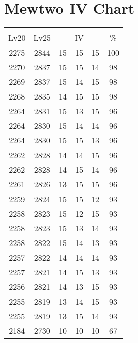 \documentclass{article}%
\begin{document}
%
\normalsize%
\section{Mewtwo IV Chart}%
\label{sec:Mewtwo IV Chart}%
\renewcommand{\arraystretch}{1.5}%
\begin{tabular}{|c|c|c|c|c|c|}%
\hline%
\multicolumn{6}{|c|}{\textcolor{white}{ 
\linebreak{Mewtwo}
}%
\cellcolor{black}}\\%
\multicolumn{1}{|c}{Lv20}&\multicolumn{1}{c|}{Lv25}&\multicolumn{3}{c|}{IV}&\multicolumn{1}{|c|}{\%}\\%
\hline%
\rowcolor{color100}%
2275&2844&15&15&15&100\\%
\hline%
\rowcolor{color98}%
2270&2837&15&15&14&98\\%
\hline%
\rowcolor{color98}%
2269&2837&15&14&15&98\\%
\hline%
\rowcolor{color98}%
2268&2835&14&15&15&98\\%
\hline%
\rowcolor{color96}%
2264&2831&15&13&15&96\\%
\hline%
\rowcolor{color96}%
2264&2830&15&14&14&96\\%
\hline%
\rowcolor{color96}%
2264&2830&15&15&13&96\\%
\hline%
\rowcolor{color96}%
2262&2828&14&14&15&96\\%
\hline%
\rowcolor{color96}%
2262&2828&14&15&14&96\\%
\hline%
\rowcolor{color96}%
2261&2826&13&15&15&96\\%
\hline%
\rowcolor{color93}%
2259&2824&15&15&12&93\\%
\hline%
\rowcolor{color93}%
2258&2823&15&12&15&93\\%
\hline%
\rowcolor{color93}%
2258&2823&15&13&14&93\\%
\hline%
\rowcolor{color93}%
2258&2822&15&14&13&93\\%
\hline%
\rowcolor{color93}%
2257&2822&14&14&14&93\\%
\hline%
\rowcolor{color93}%
2257&2821&14&15&13&93\\%
\hline%
\rowcolor{color93}%
2256&2821&14&13&15&93\\%
\hline%
\rowcolor{color93}%
2255&2819&13&14&15&93\\%
\hline%
\rowcolor{color93}%
2255&2819&13&15&14&93\\%
\hline%
\rowcolor{color91}%
2184&2730&10&10&10&67\\%
\end{tabular}

%
\end{document}
